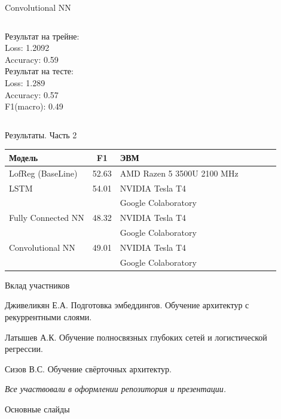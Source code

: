 \documentclass[c, aspectratio = 43]{beamer}
\begin{document}
\begin{frame}{Convolutional NN}
\begin{columns}
\begin{column}{0.5\textwidth}
                Результат на трейне:\\
                Loss: 1.2092\\
                Accuracy: 0.59\\

                Результат на тесте:\\
                Loss: 1.289\\
                Accuracy: 0.57\\
                F1(macro): 0.49\\
            \end{column}

        \end{columns}


    \end{frame}
  \begin{frame}{Результаты. Часть 2}


\begin{table}[]
\begin{tabular}{lclclcl}
\hline
 Модель & F1 & ЭВМ \\
 \hline
 LofReg (BaseLine) & 52.63 & AMD Razen 5 3500U 2100 MHz\\
\hline
LSTM & 54.01 & NVIDIA Tesla T4 \\
&&Google Colaboratory\\
\hline
 Fully Connected NN & 48.32 & NVIDIA Tesla T4  \\
&&Google Colaboratory\\
\hline
Convolutional NN & 49.01 & NVIDIA Tesla T4  \\
&&Google Colaboratory\\
\hline
\end{tabular}
\end{table}

\end{frame}



\begin{frame}{Вклад участников}

	\begin{block}{Дживеликян Е.А.}
		Подготовка эмбеддингов. Обучение архитектур с рекуррентными слоями.
	\end{block}

	\begin{block}{Латышев А.К.}
		Обучение полносвязных глубоких сетей и логистической регрессии.
	\end{block}
	
	\begin{block}{Сизов В.С.}
		Обучение свёрточных архитектур. 
	\end{block}

	\vfill
	\textit{Все участвовали в оформлении репозитория и презентации.}

\end{frame}



\beamertemplatenavigationsymbolsempty
\begin{frame}[noframenumbering]{Основные слайды}
	\hypertarget{toc}{}
	\tableofcontents[part=1]
\end{frame}
\end{document}
